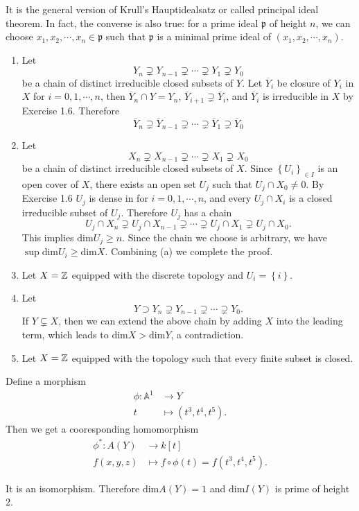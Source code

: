 \begin{remark}
  It is the general version of Krull's Hauptidealsatz or called principal ideal theorem. In fact, the converse is also true: for a prime ideal $\mathfrak{p}$ of height $n$, we can choose $x_1,x_2,\cdots,x_n\in \mathfrak{p}$ such that $\mathfrak{p}$ is a minimal prime ideal of $(x_1,x_2,\cdots,x_n)$.
\end{remark}
\begin{solution}
  \begin{enumerate}
    \item Let 
  \[
  Y_n\supsetneq Y_{n-1}\supsetneq \cdots\supsetneq Y_1\supsetneq Y_0
  \] 
  be a chain of distinct irreducible closed subsets of $Y$. Let $\overline{Y}_i$ be closure of $Y_i$ in $X$ for $i=0,1,\cdots,n$, then $\overline{Y}_n \cap Y=Y_n$, $\overline{Y}_{i+1}\supsetneq \overline{Y}_i$, and $\overline{Y}_i$ is irreducible in $X$ by Exercise 1.6. Therefore
  \[
  \overline{Y}_n\supsetneq \overline{Y}_{n-1}\supsetneq \cdots\supsetneq \overline{Y}_1\supsetneq \overline{Y}_0
  \]
    \item  Let
      \[
  X_n\supsetneq X_{n-1}\supsetneq \cdots\supsetneq X_1\supsetneq X_0
    \]
    be a chain of distinct irreducible closed subsets of $X$. Since $\left\{U_i\right\} _{\in I}$ is an open cover of $X$, there exists an open set $U_j$ such that $U_j\cap X_0\neq 0$. By Exercise 1.6 $U_j$ is dense in for $i=0,1,\cdots,n$, and every $U_j\cap X_i$ is a closed irreducible subset of $U_j$. Therefore $U_j$ has a chain
    \[
    U_j\cap X_n\supsetneq U_j\cap X_{n-1}\supsetneq \cdots\supsetneq U_j\cap X_1\supsetneq U_j\cap  X_0.
    \]
    This implies $\mathrm{dim}U_j\ge n$. Since the chain we choose is arbitrary, we have $\sup \mathrm{dim}U_i\ge \mathrm{dim}X$. Combining (a) we complete the proof.
  \item Let $X=\mathbb{Z}$ equipped with the discrete topology and $U_i=\left\{i\right\} $.
  \item Let 
     \[
       Y\supset Y_n\supsetneq Y_{n-1}\supsetneq \cdots\supsetneq Y_0.
    \] 
    If $Y\subsetneq X$, then we can extend the above chain by adding $X$ into the leading term, which leads to $\mathrm{dim}X>\mathrm{dim}Y$, a contradiction.
  \item Let $X=\mathbb{Z}$ equipped with the topology such that every finite subset is closed.
  \end{enumerate}
\end{solution}
\begin{solution}
  Define a morphism
  \begin{align*}
    \phi: \mathbb{A}^{1} &\longrightarrow Y \\
    t &\longmapsto (t^3,t ^{4},t ^{5})
  .\end{align*} 
  Then we get a cooresponding homomorphism
  \begin{align*}
    \phi^{*}: A(Y) &\longrightarrow k[t] \\
    f(x,y,z) &\longmapsto f\circ \phi(t)= f(t^3,t ^{4},t ^{5})
  .\end{align*}
\end{solution}
It is an isomorphism. Therefore $\mathrm{dim}A(Y)=1$ and $\mathrm{dim}I(Y)$ is prime of height $2$. 

